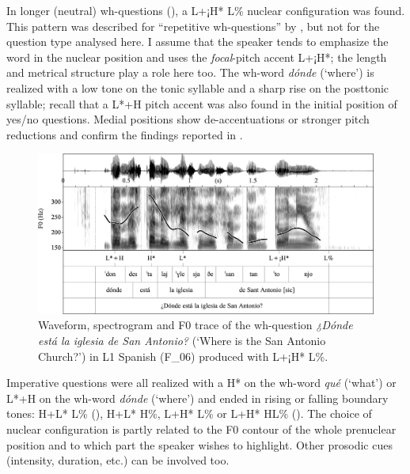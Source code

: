 In longer (neutral) wh-questions (), a L+¡H* L\% nuclear configuration was found. This pattern was described for “repetitive wh-questions” by \citet{Escandell-Vidal1998}, but not for the question type analysed here. I assume that the speaker tends to emphasize the word in the nuclear position and uses the \textit{focal}{}-pitch accent L+¡H*; the length and metrical structure play a role here too. The wh-word \textit{dónde} (‘where’) is realized with a low tone on the tonic syllable and a sharp rise on the posttonic syllable; recall that a L*+H pitch accent was also found in the initial position of yes/no questions. Medial positions show de-accentuations or stronger pitch reductions and confirm the findings reported in \citet{TorreiraEtAl2012}.

\begin{figure}


\includegraphics[width=\textwidth]{figures/Figure_4.93.png}


\caption{Waveform, spectrogram and F0 trace of the wh-question \textit{¿Dónde está la iglesia de San Antonio?} (‘Where is the San Antonio Church?’) in L1 Spanish (F\_06) produced with L+¡H* L\%.}
\label{fig:4.93}
\end{figure}

Imperative questions were all realized with a H* on the wh-word \textit{qué} (‘what’) or L*+H on the wh-word \textit{dónde} (‘where’) and ended in rising or falling boundary tones: H+L* L\% (), H+L* H\%, L+H* L\% or L+H* HL\% (). The choice of nuclear configuration is partly related to the F0 contour of the whole prenuclear position and to which part the speaker wishes to highlight. Other prosodic cues (intensity, duration, etc.) can be involved too.


